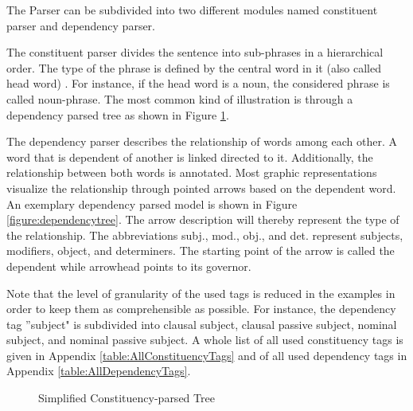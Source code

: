 The Parser can be subdivided into two different modules named constituent parser and dependency parser. 

The constituent parser divides the sentence into sub-phrases in a hierarchical order. The type of the phrase is defined by the central word in it (also called head word) \citep{jurafsky2014speech}. For instance, if the head word is a noun, the considered phrase is called noun-phrase. The most common kind of illustration is through a dependency parsed tree as shown in Figure \ref{figure:constituencytree}.

The dependency parser describes the relationship of words among each other. A word that is dependent of another is linked directed to it. Additionally, the relationship between both words is annotated. Most graphic representations visualize the relationship through pointed arrows based on the dependent word. An exemplary dependency parsed model is shown in Figure \ref{figure:dependencytree}. The arrow description will thereby represent the type of the relationship. The abbreviations subj., mod., obj., and det. represent subjects, modifiers, object, and determiners. The starting point of the arrow is called the dependent while arrowhead points to its governor.

Note that the level of granularity of the used tags is reduced in the examples in order to keep them as comprehensible as possible. For instance, the dependency tag ''subject" is subdivided into clausal subject, clausal passive subject, nominal subject, and nominal passive subject. A whole list of all used constituency tags is given in Appendix \ref{table:AllConstituencyTags} and of all used dependency tags in Appendix \ref{table:AllDependencyTags}.

\begin{figure}[h]
	\centering
	\caption{Simplified Constituency-parsed Tree }
	\label{figure:constituencytree}
\end{figure}

